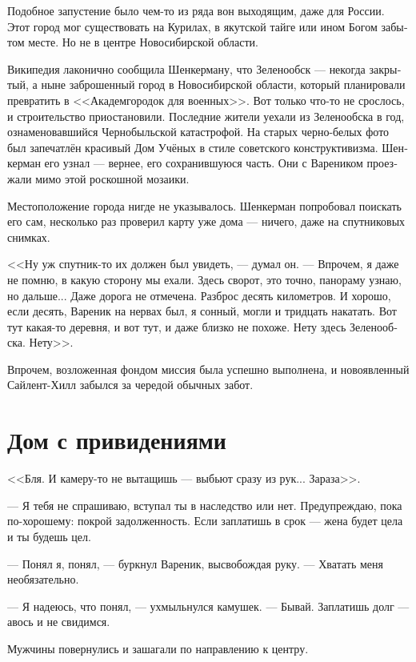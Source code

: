 \documentclass[a5paper,12pt,fleqn]{extbook}\usepackage{cooltooltips}\usepackage{polyglossia}\setdefaultlanguage[babelshorthands=true]{russian}\setotherlanguage{english}\defaultfontfeatures{Ligatures=TeX,Mapping=tex-text} \usepackage{xcolor}\definecolor{lightgray}{HTML}{bbbbbb}\color{lightgray}\newcommand{\ml}[3]{\textenglish{\textcolor{black}{#3}}}
\newcommand{\textspace}{\vspace{1em}{\centering\Large\bfseries<...>\par}\vspace{1em}}
\begin{document}
Подобное запустение было чем-то из ряда вон выходящим, даже для России.
Этот город мог существовать на Курилах, в якутской тайге или ином Богом забытом месте.
Но не в центре Новосибирской области.

Википедия лаконично сообщила Шенкерману, что Зеленообск --- некогда закрытый, а ныне заброшенный город в Новосибирской области, который планировали превратить в <<Академгородок для военных>>.
Вот только что-то не срослось, и строительство приостановили.
Последние жители уехали из Зеленообска в год, ознаменовавшийся Чернобыльской катастрофой.
На старых черно-белых фото был запечатлён красивый Дом Учёных в стиле советского конструктивизма.
Шенкерман его узнал --- вернее, его сохранившуюся часть.
Они с Вареником проезжали мимо этой роскошной мозаики.

Местоположение города нигде не указывалось.
Шенкерман попробовал поискать его сам, несколько раз проверил карту уже дома --- ничего, даже на спутниковых снимках.

<<Ну уж спутник-то их должен был увидеть, --- думал он.
--- Впрочем, я даже не помню, в какую сторону мы ехали.
Здесь сворот, это точно, панораму узнаю, но дальше...
Даже дорога не отмечена.
Разброс десять километров.
И хорошо, если десять, Вареник на нервах был, я сонный, могли и тридцать накатать.
Вот тут какая-то деревня, и вот тут, и даже близко не похоже.
Нету здесь Зеленообска.
Нету>>.

Впрочем, возложенная фондом миссия была успешно выполнена, и новоявленный Сайлент-Хилл забылся за чередой обычных забот.

\chapter{Дом с привидениями}

\textspace

<<Бля.
И камеру-то не вытащишь --- выбьют сразу из рук...
Зараза>>.

--- Я тебя не спрашиваю, вступал ты в наследство или нет.
Предупреждаю, пока по-хорошему: покрой задолженность.
Если заплатишь в срок --- жена будет цела и ты будешь цел.

--- Понял я, понял, --- буркнул Вареник, высвобождая руку.
--- Хватать меня необязательно.

--- Я надеюсь, что понял, --- ухмыльнулся камушек.
--- Бывай.
Заплатишь долг --- авось и не свидимся.

Мужчины повернулись и зашагали по направлению к центру.
\end{document}
